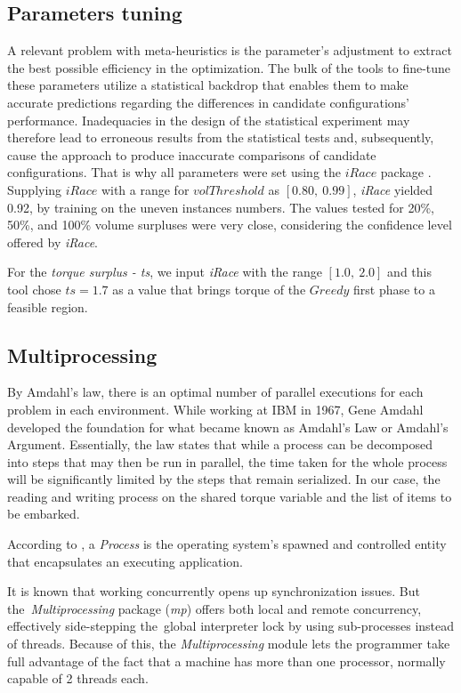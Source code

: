 \documentclass[preprint,authoryear]{elsarticle}
\begin{document}
\subsection{Parameters tuning}

A relevant problem with meta-heuristics is the parameter's adjustment to extract the best possible efficiency in the optimization. The bulk of the tools to fine-tune these parameters utilize a statistical backdrop that enables them to make accurate predictions regarding the differences in candidate configurations' performance. Inadequacies in the design of the statistical experiment may therefore lead to erroneous results from the statistical tests and, subsequently, cause the approach to produce inaccurate comparisons of candidate configurations. That is why all parameters were set using the $iRace$ package \cite{LopezIbanezManuel2016}. Supplying $iRace$ with a range for $volThreshold$ as $[0.80,\ 0.99]$, {\it iRace} yielded 0.92, by training on the uneven instances numbers. The values tested for 20\%, 50\%, and 100\% volume surpluses were very close, considering the confidence level offered by {\it iRace}.

For the {\it torque surplus - ts}, we input {\it iRace} with the range $[1.0,\ 2.0]$ and this tool chose $ts = 1.7$ as a value that brings torque of the $Greedy$ first phase to a feasible region.

\subsection{Multiprocessing}

By Amdahl's law, there is an optimal number of parallel executions for each problem in each environment. While working at IBM in 1967, Gene Amdahl developed the foundation for what became known as Amdahl's Law or Amdahl's Argument. Essentially, the law states that while a process can be decomposed into steps that may then be run in parallel, the time taken for the whole process will be significantly limited by the steps that remain serialized. In our case, the reading and writing process on the shared torque variable and the list of items to be embarked.

According to \cite[p.271]{Breshears2009}, a {\it Process} is the operating system’s spawned and controlled entity that encapsulates an executing application.

It is known that working concurrently opens up synchronization issues. But the {\it Multiprocessing} package ({\it mp}) offers both local and remote concurrency, effectively side-stepping the global interpreter lock by using sub-processes instead of threads. Because of this, the {\it Multiprocessing} module lets the programmer take full advantage of the fact that a machine has more than one processor, normally capable of 2 threads each.
\end{document}
